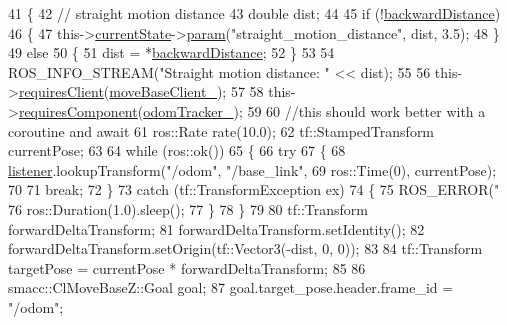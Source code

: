 \begin{DoxyCode}
41     \{
42         \textcolor{comment}{// straight motion distance}
43         \textcolor{keywordtype}{double} dist;
44 
45         \textcolor{keywordflow}{if} (!\hyperlink{classsm__dance__bot_1_1CbNavigateBackwards_ace20c1dfa7b8e84c754aedbd3dd00fdf}{backwardDistance})
46         \{
47             this->\hyperlink{classsmacc_1_1SmaccClientBehavior_af76fc9b877542ed5caf033f820c107d0}{currentState}->\hyperlink{classsmacc_1_1ISmaccState_a4982f2187ed6da337462721146e8ef70}{param}(\textcolor{stringliteral}{"straight\_motion\_distance"}, dist, 3.5);
48         \}
49         \textcolor{keywordflow}{else}
50         \{
51             dist = *\hyperlink{classsm__dance__bot_1_1CbNavigateBackwards_ace20c1dfa7b8e84c754aedbd3dd00fdf}{backwardDistance};
52         \}
53 
54         ROS\_INFO\_STREAM(\textcolor{stringliteral}{"Straight motion distance: "} << dist);
55 
56         this->\hyperlink{classsmacc_1_1SmaccClientBehavior_adc21bbd45d36bd81ca6f778ed161807a}{requiresClient}(\hyperlink{classsm__dance__bot_1_1CbNavigateBackwards_ae4cd503172b4f5c7b0dba49aec08885e}{moveBaseClient\_});
57 
58         this->\hyperlink{classsmacc_1_1SmaccClientBehavior_a011246bb1424f8bf8c9322f652db9d88}{requiresComponent}(\hyperlink{classsm__dance__bot_1_1CbNavigateBackwards_ad3e1305c551fe5dcbfb92b1e080f382d}{odomTracker\_});
59 
60         \textcolor{comment}{//this should work better with a coroutine and await}
61         ros::Rate rate(10.0);
62         tf::StampedTransform currentPose;
63 
64         \textcolor{keywordflow}{while} (ros::ok())
65         \{
66             \textcolor{keywordflow}{try}
67             \{
68                 \hyperlink{classsm__dance__bot_1_1CbNavigateBackwards_a4ec9af0d5b94c5e0654a768c36bec85b}{listener}.lookupTransform(\textcolor{stringliteral}{"/odom"}, \textcolor{stringliteral}{"/base\_link"},
69                                          ros::Time(0), currentPose);
70 
71                 \textcolor{keywordflow}{break};
72             \}
73             \textcolor{keywordflow}{catch} (tf::TransformException ex)
74             \{
75                 ROS\_ERROR(\textcolor{stringliteral}{"%
76                 ros::Duration(1.0).sleep();
77             \}
78         \}
79 
80         tf::Transform forwardDeltaTransform;
81         forwardDeltaTransform.setIdentity();
82         forwardDeltaTransform.setOrigin(tf::Vector3(-dist, 0, 0));
83 
84         tf::Transform targetPose = currentPose * forwardDeltaTransform;
85 
86         smacc::ClMoveBaseZ::Goal goal;
87         goal.target\_pose.header.frame\_id = \textcolor{stringliteral}{"/odom"};
}
\end{DoxyCode}
